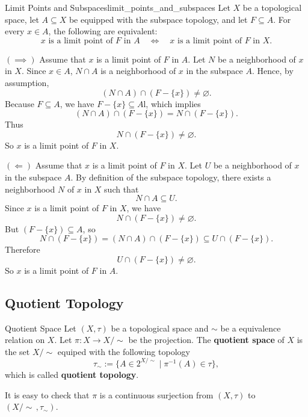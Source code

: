 \documentclass{report}
\begin{document}
\begin{proposition}{Limit Points and Subspaces}{limit_points_and_subspaces}
Let \(X\) be a topological space, let \(A\subseteq X\) be equipped with the subspace topology, and let
\(F\subseteq A\). For every \(x\in A\), the following are equivalent:
\[
    x \text{ is a limit point of } F \text{ in } A
    \quad\Longleftrightarrow\quad
    x \text{ is a limit point of } F \text{ in } X.
\]
\end{proposition}

\begin{prf}
\((\implies)\) Assume that \(x\) is a limit point of \(F\) in \(A\). Let \(N\) be a neighborhood of \(x\) in \(X\).
Since \(x\in A\), $N\cap A$ is a neighborhood of \(x\) in the subspace \(A\). Hence, by assumption,
\[
    (N\cap A)\cap (F-\{x\})\neq\varnothing.
\]
Because \(F\subseteq A\), we have \(F-\{x\}\subseteq A\)l, which implies
\[
    (N\cap A)\cap (F-\{x\})
    =
    N\cap (F-\{x\}).
\]
Thus
\[
    N\cap (F-\{x\})\neq\varnothing.
\]
So \(x\) is a limit point of \(F\) in \(X\).

\((\Longleftarrow)\) Assume that \(x\) is a limit point of \(F\) in \(X\). Let \(U\) be a neighborhood of \(x\) in the subspace \(A\).
By definition of the subspace topology, there exists a neighborhood \(N\) of \(x\) in \(X\) such that
\[
    N\cap A\subseteq U.
\]
Since \(x\) is a limit point of \(F\) in \(X\), we have
\[
    N\cap (F-\{x\})\neq\varnothing.
\]
But \((F-\{x\})\subseteq A\), so
\[
    N\cap (F-\{x\})
    =
    (N\cap A)\cap (F-\{x\})
    \subseteq U\cap (F-\{x\}).
\]
Therefore
\[
    U\cap (F-\{x\})\neq\varnothing.
\]
So \(x\) is a limit point of \(F\) in \(A\).

\end{prf}

\subsection{Quotient Topology}
\begin{definition}{Quotient Space}{}
	Let $(X,\tau)$ be a topological space and $\sim$ be a equivalence relation on $X$. Let $\pi:X\to X/\sim$ be the projection.
	The \textbf{quotient space} of $X$ is the set $X/\sim$ equiped with the following topology
	\[
		\tau_\sim:=\{A\in 2^{X/\sim}\mid \pi^{-1}(A)\in \tau\},
	\]
	which is called \textbf{quotient topology}.
\end{definition}


It is easy to check that $\pi$ is a continuous surjection from $(X,\tau)$ to $(X/\sim\,,\tau_\sim)$.
\end{document}
